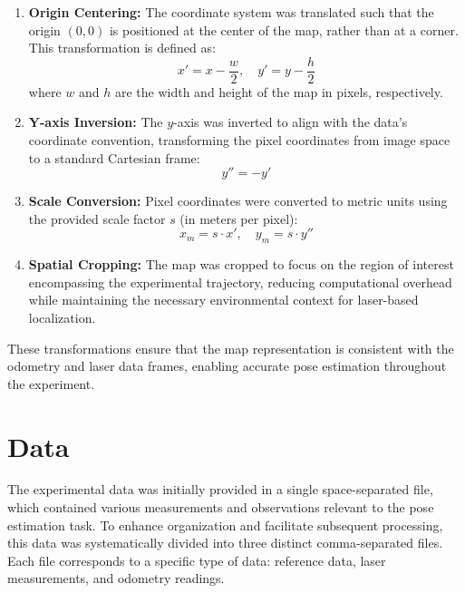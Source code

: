 \documentclass[conference]{IEEEtran}
\begin{document}
\begin{enumerate}
    \item \textbf{Origin Centering:} The coordinate system was translated such that the origin $(0, 0)$ is positioned at the center of the map, rather than at a corner. This transformation is defined as:
    \begin{equation}
        x' = x - \frac{w}{2}, \quad y' = y - \frac{h}{2}
    \end{equation}
    where $w$ and $h$ are the width and height of the map in pixels, respectively.
    
    \item \textbf{Y-axis Inversion:} The $y$-axis was inverted to align with the data's coordinate convention, transforming the pixel coordinates from image space to a standard Cartesian frame:
    \begin{equation}
        y'' = -y'
    \end{equation}
    
    \item \textbf{Scale Conversion:} Pixel coordinates were converted to metric units using the provided scale factor $s$ (in meters per pixel):
    \begin{equation}
        x_m = s \cdot x', \quad y_m = s \cdot y''
    \end{equation}
    
    \item \textbf{Spatial Cropping:} The map was cropped to focus on the region of interest encompassing the experimental trajectory, reducing computational overhead while maintaining the necessary environmental context for laser-based localization.
\end{enumerate}

These transformations ensure that the map representation is consistent with the odometry and laser data frames, enabling accurate pose estimation throughout the experiment.

\section{Data} \label{sec:data}

The experimental data was initially provided in a single space-separated file, which contained various measurements and observations relevant to the pose estimation task. To enhance organization and facilitate subsequent processing, this data was systematically divided into three distinct comma-separated files. Each file corresponds to a specific type of data: reference data, laser measurements, and odometry readings.
\end{document}
